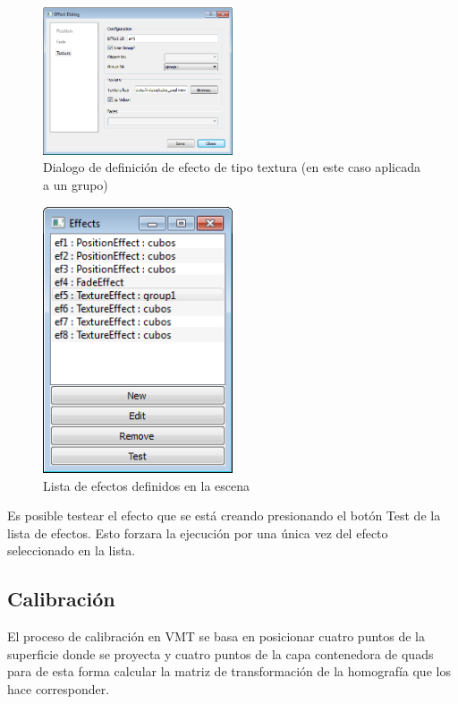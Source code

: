 \begin{figure}[H]
  \centering
    \includegraphics[width=0.5\textwidth]{./Cap5_vmt/vmt_EfectDialog3.png}
  \caption{Dialogo de definición de efecto de tipo textura (en este caso aplicada a un grupo)}
  \label{fig:VMT-EffectTexture}
\end{figure}

\begin{figure}[H]
  \centering
    \includegraphics[width=0.5\textwidth]{./Cap5_vmt/vmt_Efects.png}
  \caption{Lista de efectos definidos en la escena}
  \label{fig:VMT-EffectList}
\end{figure}

Es posible testear el efecto que se está creando presionando el botón Test de la lista de efectos. Esto forzara la ejecución por una única vez del efecto seleccionado en la lista.

\subsection{Calibración}

El proceso de calibración en VMT se basa en posicionar cuatro puntos de la superficie donde se proyecta y cuatro puntos de la capa contenedora de quads para de esta forma calcular la matriz de transformación de la homografía que los hace corresponder.

